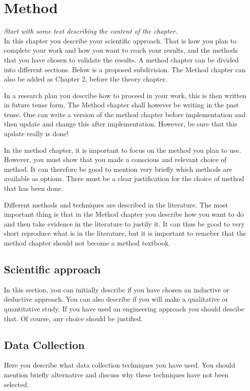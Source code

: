 \chapter{Method}
\emph{Start with some text describing the content of the chapter.}\\

\noindent In this chapter you describe your scientific approach. That is how you plan to complete your work and how you want to reach your results, and the methods that you have chosen to validate the results. A method chapter can be divided into different sections. Below is a proposed subdivision. The Method chapter can also be added as Chapter 2, before the theory chapter.

In a research plan you describe how to proceed in your work, this is then written in future tense form. The Method chapter shall however be writing in the past tense. One can write a version of the method chapter before implementation and then update and change this after implementation. However, be sure that this update really is done!

In the method chapter, it is important to focus on the method you plan to use. However, you must show that you made a conscious and relevant choice of method. It can therefore be good to mention very briefly which methods are available as options. There must be a clear justification for the choice of method that has been done.

Different methods and techniques are described in the literature. The most important thing is that in the Method chapter you describe how you want to do and then take evidence in the literature to justify it. It can thus be good to very short reproduce what is in the literature, but it is important to remeber that the method chapter should not become a method textbook.

\section{Scientific approach}
In this section, you can initially describe if you have chosen an inductive or deductive approach. You can also describe if you will make a qualitative or quantitative study. If you have used an engineering approach you should descibe that. Of course, any choice should be justified.

\section{Data Collection}
Here you describe what data collection techniques you have used. You should mention briefly alternative and discuss why these techniques have not been selected. 

